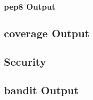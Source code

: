 	\subsubsection{pep8 Output}
	

	\subsection*{coverage Output}
	
	
	\subsection{Security}
	\subsection*{bandit Output}
	